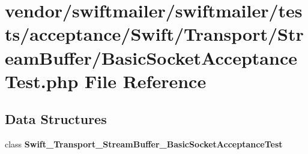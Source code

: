 \section{vendor/swiftmailer/swiftmailer/tests/acceptance/\+Swift/\+Transport/\+Stream\+Buffer/\+Basic\+Socket\+Acceptance\+Test.php File Reference}
\label{_basic_socket_acceptance_test_8php}
\subsection*{Data Structures}
\begin{DoxyCompactItemize}
\item 
class {\bf Swift\+\_\+\+Transport\+\_\+\+Stream\+Buffer\+\_\+\+Basic\+Socket\+Acceptance\+Test}
\end{DoxyCompactItemize}
